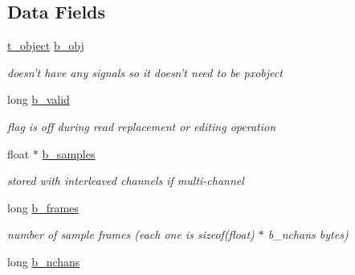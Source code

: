 \subsection*{Data Fields}
\begin{DoxyCompactItemize}
\item 
\hypertarget{structt__buffer_a5f5c5da40aa47c35198cac506996b9fb}{
\hyperlink{structt__object}{t\_\-object} \hyperlink{structt__buffer_a5f5c5da40aa47c35198cac506996b9fb}{b\_\-obj}}
\label{structt__buffer_a5f5c5da40aa47c35198cac506996b9fb}

\begin{DoxyCompactList}\small\item\em doesn't have any signals so it doesn't need to be pxobject \item\end{DoxyCompactList}\item 
\hypertarget{structt__buffer_a68304a36f9a9da0d58c56117d6fece1a}{
long \hyperlink{structt__buffer_a68304a36f9a9da0d58c56117d6fece1a}{b\_\-valid}}
\label{structt__buffer_a68304a36f9a9da0d58c56117d6fece1a}

\begin{DoxyCompactList}\small\item\em flag is off during read replacement or editing operation \item\end{DoxyCompactList}\item 
\hypertarget{structt__buffer_ac1134bb20031735cac91d0e539411154}{
float $\ast$ \hyperlink{structt__buffer_ac1134bb20031735cac91d0e539411154}{b\_\-samples}}
\label{structt__buffer_ac1134bb20031735cac91d0e539411154}

\begin{DoxyCompactList}\small\item\em stored with interleaved channels if multi-\/channel \item\end{DoxyCompactList}\item 
\hypertarget{structt__buffer_aca877f0da232ca017487eac34c952c34}{
long \hyperlink{structt__buffer_aca877f0da232ca017487eac34c952c34}{b\_\-frames}}
\label{structt__buffer_aca877f0da232ca017487eac34c952c34}

\begin{DoxyCompactList}\small\item\em number of sample frames (each one is sizeof(float) $\ast$ b\_\-nchans bytes) \item\end{DoxyCompactList}\item 
\hypertarget{structt__buffer_a38aa1caa16c7dc52d8680c4d7d69c807}{
long \hyperlink{structt__buffer_a38aa1caa16c7dc52d8680c4d7d69c807}{b\_\-nchans}}
\label{structt__buffer_a38aa1caa16c7dc52d8680c4d7d69c807}


\end{DoxyCompactItemize}
